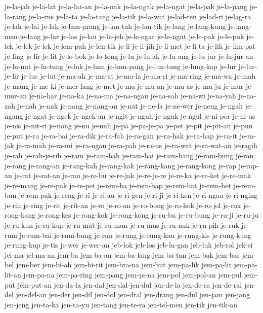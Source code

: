 {je-la-jah je-la-lat je-la-lat-an je-la-nak je-la-ngak je-la-ngat je-la-pak
je-la-pang je-la-rang je-la-rus je-la-ta je-la-tang je-la-tik je-la-wat
je-lad-ren je-lad-ri je-lag-ra je-lah je-lai je-lak je-lam-prang
je-lan-tah je-lan-tik je-lang je-lang-kung je-lang-men-je-lang je-lar
je-las je-lau je-le-jeh je-le-ngar je-le-ngut je-le-pak je-le-pok je-lek
je-lek-je-lek je-lem-pah je-len-tik je-li je-li-jih je-li-met je-li-ta
je-lih je-lim-pat je-ling je-lir je-lit je-lo-bok je-lo-tong je-lu
je-lu-ak je-lu-ang je-lu-jur je-lu-jur-an je-lu-nut je-lu-tung je-luk
je-lum je-lum-pang je-lun-tung je-lung-kap je-lur je-lur-je-lir je-lus
je-lut je-ma-ah je-ma-at je-ma-la je-ma-ri je-ma-ring je-ma-wa je-mah
je-mang je-me-ki je-mer-lang je-met je-mu je-mu-an je-mu-as je-mu-ju
je-mur je-mur-an je-na-har je-na-ka je-na-ma je-na-ngau je-na-sah je-na-wi
je-na-yah je-na-zah je-nah je-nak je-nang je-nang-an je-nat je-ne-la
je-ne-wer je-neng je-ngah je-ngang je-ngat je-ngek je-ngek-an je-ngit
je-nguh je-nguk je-ngul je-ni-per je-ni-us je-nis je-nit-ri je-nong je-nu
je-nuh je-pa je-pa-je-pa je-pet je-pit je-pit-an je-pun je-put je-ra
je-ra-bai je-ra-dik je-ra-fah je-ra-gan je-ra-hak je-ra-hap je-ra-it
je-ra-jak je-ra-mah je-ra-mi je-ra-ngau je-ra-pah je-ra-us je-ra-wat
je-ra-wat-an je-ragih je-rah je-rah-je-rih je-ram je-ram-bah je-ram-bai
je-ram-bang je-ram-bung je-ran je-rang je-rang-an je-rang-kah je-rang-kak
je-rang-kang je-rang-kong je-rap je-rap-an je-rat je-rat-an je-rau
je-re-bu je-re-jak je-re-je-re je-re-ka je-re-ket je-re-mak je-re-mang
je-re-pak je-re-pet je-rem-ba je-rem-bap je-rem-bat je-rem-bet je-rem-bun
je-rem-pak je-reng je-ri je-ri-au je-ri-gen je-ri-ji je-ri-ken je-ri-ngau
je-ri-nging je-rih je-ring je-rit je-rit-an je-ro je-ro-an je-ro-bong
je-ro-hok je-ro-jol je-rok je-rong-kang je-rong-kes je-rong-kok
je-rong-kong je-ru-bu je-ru-bung je-ru-ji je-ru-ju je-ru-kun je-ru-kup
je-ru-mat je-ru-mun je-ru-mus je-ru-nuk je-ru-pih je-ruk je-rum je-rum-bai
je-rum-bung je-run je-rung je-rung-kau je-rung-kis je-rung-kung
je-rung-kup je-tis je-wer je-wer-an jeb-lok jeb-los jeb-lu-gan jeb-luk
jeb-rol jek-si jel-ma jel-ma-an jem-ba jem-ba-an jem-ba-lang jem-ba-tan
jem-bak jem-bar jem-bel jem-ber jem-bi-ah jem-bi-rit jem-bra-na jem-but
jem-pa-lik jem-pa-lit jem-pa-lit-an jem-pa-na jem-pa-ring jem-pang
jem-pi-na jem-pol jem-pol-an jem-pul jem-put jem-put-an jen-da-la jen-dal
jen-dal-jen-dul jen-de-la jen-de-ra jen-de-ral jen-del jen-del-an jen-der
jen-dil jen-dol jen-dral jen-drang jen-dul jen-jam jen-jang jen-jeng
jen-ta-ka jen-ta-yu jen-tang jen-te-ra jen-tel-men jen-tik jen-tik-an
}
